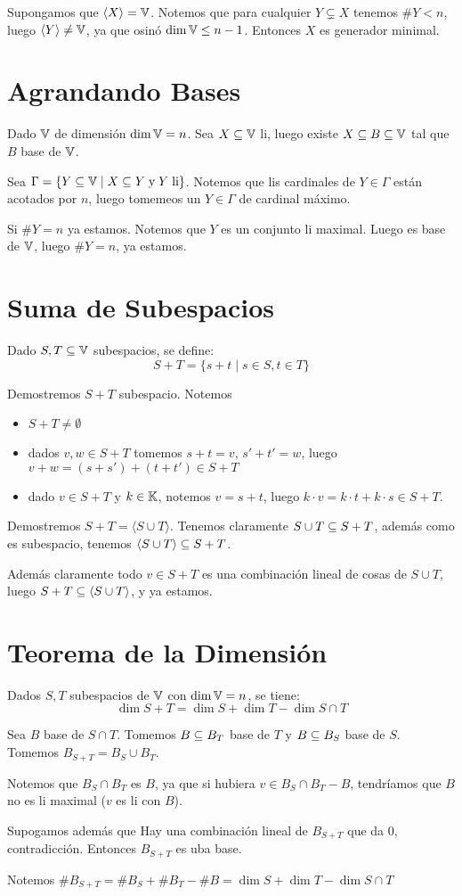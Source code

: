 \documentclass{article}
\begin{document}
Supongamos que $\langle X \rangle = \mathbb{V}$. Notemos que para cualquier $Y \subsetneq X$ tenemos
$\# Y < n$, luego $\langle Y \rangle \neq \mathbb{V}$, ya que osinó $\dim \mathbb{V} \leq n-1$. Entonces
$X$ es generador minimal.

\section{Agrandando Bases}
Dado $\mathbb{V}$ de dimensión $\dim \mathbb{V} = n$. Sea $X\subseteq \mathbb{V}$ li, luego existe $X \subseteq B \subseteq \mathbb{V}$
tal que $B$ base de $\mathbb{V}$.

Sea $\Gamma = \{Y \subseteq \mathbb{V} \mid X \subseteq Y \;\text{y}\; Y \;\text{li}\}$.
Notemos que lis cardinales de $Y \in \Gamma$ están acotados por $n$, luego tomemeos un
$Y \in \Gamma$ de cardinal máximo.

Si $\# Y = n$ ya estamos.
Notemos que $Y$ es un conjunto li maximal. Luego es base de $\mathbb{V}$, luego $\# Y = n$, ya
estamos.

\section{Suma de Subespacios}
Dado $S, T \subseteq \mathbb{V}$ subespacios, se define:
\[S + T = \{s + t \mid s \in S, t\in T\}\]

Demostremos $S + T$ subespacio.
Notemos
\begin{itemize}
	\item $S + T \neq \emptyset$
	\item dados $v, w \in S + T$ tomemos $s + t = v$, $s' + t' = w$, luego
		$v + w = (s + s') + (t + t') \in S+T$
	\item dado $v \in S + T$ y $k \in \mathbb{K}$, notemos $v = s + t$, luego $k \cdot v =
		k \cdot t + k \cdot s \in S + T$.
\end{itemize}

Demostremos $S + T = \langle S \cup T\rangle$. Tenemos claramente $S \cup T \subseteq S + T$,
además como es subespacio, tenemos $\langle S \cup T \rangle \subseteq S + T$.

Además claramente todo $v \in S + T$ es una combinación lineal de cosas de $S \cup T$, luego
$S + T \subseteq \langle S \cup T \rangle$, y ya estamos.

\section{Teorema de la Dimensión}
Dados $S, T$ subespacios de $\mathbb{V}$ con $\dim \mathbb{V} = n$, se tiene:
\[\dim S + T = \dim S + \dim T - \dim S \cap T\]

Sea $B$ base de $S \cap T$. Tomemos $B \subseteq B_T$ base de $T$ y $B \subseteq B_S$ base de $S$.
Tomemos $B_{S + T} = B_S \cup B_T$.

Notemos que $B_S \cap B_T$ es $B$, ya que si hubiera $v \in B_S \cap B_T - B$, tendríamos
que $B$ no es li maximal ($v$ es li con $B$).

Supogamos además que Hay una combinación lineal de $B_{S+T}$ que da 0, contradicción.
Entonces $B_{S + T}$ es uba base.

Notemos $\# B_{S + T} = \# B_S + \# B_T - \# B = \dim S + \dim T - \dim S \cap T$
\end{document}
